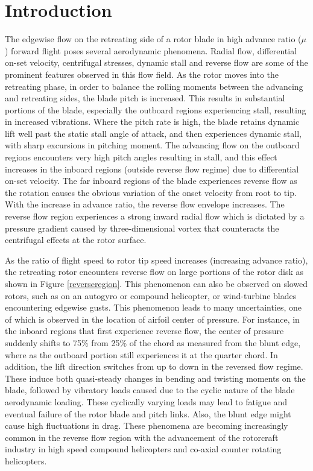 \documentclass[%
 reprint,
 showkeys,
 amsmath,amssymb,
 aps,
]{revtex4-1}
\begin{document}

\section{Introduction}
The edgewise flow on the retreating side of a rotor blade in high advance ratio ($\mu$) forward flight poses several aerodynamic phenomena. Radial flow, differential on-set velocity, centrifugal stresses, dynamic stall and reverse flow are some of the prominent features observed in this flow field. As the rotor moves into the retreating phase, in order to balance the rolling moments between the advancing and retreating sides, the blade pitch is increased. This results in substantial portions of the blade, especially the outboard regions experiencing stall, resulting in increased vibrations. Where the pitch rate is high, the blade retains dynamic lift well past the static stall angle of attack, and then experiences dynamic stall, with sharp excursions in pitching moment. The advancing flow on the outboard regions encounters very high pitch angles resulting in stall, and this effect increases in the inboard regions (outside reverse flow regime) due to differential on-set velocity. The far inboard regions of the blade experiences reverse flow as the rotation causes the obvious variation of the onset velocity from root to tip. With the increase in advance ratio, the reverse flow envelope increases. The reverse flow region experiences a strong inward radial flow which is dictated by a pressure gradient caused by three-dimensional vortex that counteracts the centrifugal effects at the rotor surface. 

As the ratio of flight speed to rotor tip speed increases (increasing advance ratio), the retreating rotor encounters reverse flow on large portions of the rotor disk as shown in Figure \ref{reverseregion}. This phenomenon can also be observed on slowed rotors, such as on an autogyro or compound helicopter, or wind-turbine blades encountering edgewise gusts. This phenomenon leads to many uncertainties, one of which is observed in the location of airfoil center of pressure. For instance, in the inboard regions that first experience reverse flow, the center of pressure suddenly shifts to 75\% from 25\% of the chord as measured from the blunt edge, where as the outboard portion still experiences it at the quarter chord. In addition, the lift direction switches from up to down in the reversed flow regime. These induce both quasi-steady changes in bending and twisting moments on the blade, followed by vibratory loads caused due to the cyclic nature of the blade aerodynamic loading. These cyclically varying loads may lead to fatigue and eventual failure of the rotor blade and pitch links. Also, the blunt edge might cause high fluctuations in drag. These phenomena are becoming increasingly common in the reverse flow region with the advancement of the rotorcraft industry in high speed compound helicopters and co-axial counter rotating helicopters.
\end{document}

